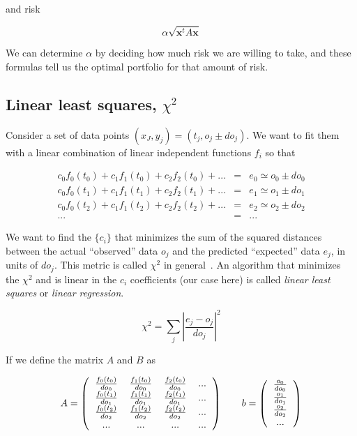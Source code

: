 \documentclass[justified, sixbynine]{tufte-book}
\theoremstyle{plain}%
\newtheorem * {corollary}{Corollary}
\theoremstyle{definition}
\theoremstyle{remark}
\newtheorem * {remark}{Remark}
\newtheorem * {note}{Note}
\begin{document}
\begin{fullwidth}
and risk

\begin{equation}
\alpha \sqrt{\mathbf{x}^t A \mathbf{x}}
\end{equation}

We can determine $\alpha$ by deciding how much risk we are willing to take, and these formulas tell us the optimal portfolio for that amount of risk.

\goodbreak\subsection{Linear least squares, $\chi^2$}


Consider a set of data points $(x_J, y_j) = (t_j, o_j \pm do_j)$. We want to fit them with a linear combination of linear independent functions $f_i$ so that

\begin{eqnarray}
c_0 f_0(t_0) + c_1 f_1(t_0) + c_2 f_2(t_0) +  ... & = & e_0 \simeq o_0 \pm do_0\\
c_0 f_0(t_1) + c_1 f_1(t_1) + c_2 f_2(t_1) +  ... & = & e_1 \simeq o_1 \pm do_1\\
c_0 f_0(t_2) + c_1 f_1(t_2) + c_2 f_2(t_2) +  ... & = & e_2 \simeq o_2 \pm do_2\\
... &=& ...
\end{eqnarray}

We want to find the $\{c_i\}$ that minimizes the sum of the squared distances between the actual ``observed'' data $o_j$ and the predicted ``expected'' data $e_j$, in units of $do_j$. This metric is called $\chi^2$ in general~\cite{chi2}. An algorithm that minimizes the $\chi^2$  and is linear in the $c_i$ coefficients (our case here) is called {\it linear least squares} or {\it linear regression}.

\begin{equation}
\chi^2 = \sum_j \left|\frac{e_j - o_j}{do_j}\right|^2
\end{equation}

If we define the matrix $A$ and $B$ as

\begin{equation}
A=\left(
\begin{tabular}{cccc}
$\frac{f_0(t_0)}{do_0}$ & $\frac{f_1(t_0)}{do_0}$ & $\frac{f_2(t_0)}{do_0}$ &...\\
$\frac{f_0(t_1)}{do_1}$ & $\frac{f_1(t_1)}{do_1}$ & $\frac{f_2(t_1)}{do_1}$ &...\\
$\frac{f_0(t_2)}{do_2}$ & $\frac{f_1(t_2)}{do_2}$ & $\frac{f_2(t_2)}{do_2}$ &...\\
...& ...& ... & ...
\end{tabular}
\right) \qquad b =
\left(
\begin{tabular}{c}
$\frac{o_0}{do_0}$ \\
$\frac{o_1}{do_1}$ \\
$\frac{o_2}{do_2}$ \\
...
\end{tabular}
\right)
\end{equation}


\end{fullwidth}
\end{document}
